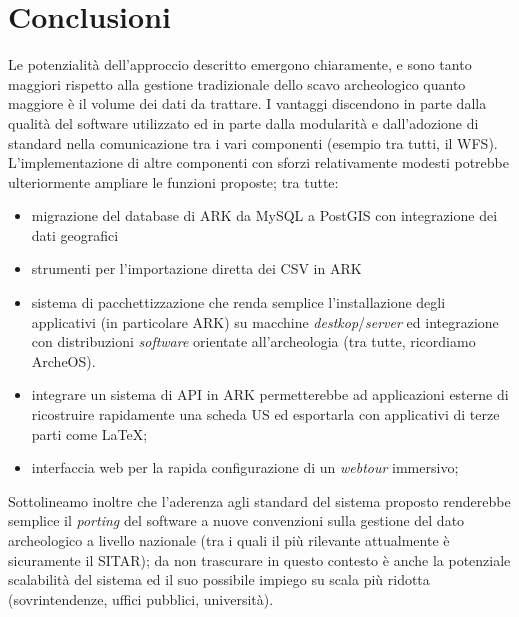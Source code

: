 \documentclass{paper}
\begin{document}
\section{Conclusioni}

    Le potenzialità dell'approccio descritto emergono chiaramente, e sono tanto maggiori rispetto alla gestione tradizionale dello scavo archeologico quanto maggiore è il volume dei dati da trattare. I vantaggi discendono in parte dalla qualità del software utilizzato ed in parte dalla modularità e dall'adozione di standard nella comunicazione tra i vari componenti (esempio tra tutti, il WFS). L'implementazione di altre componenti con sforzi relativamente modesti potrebbe ulteriormente ampliare le funzioni proposte; tra tutte:

    \begin{itemize}
        \item migrazione del database di ARK da MySQL a PostGIS con integrazione dei dati geografici
        \item strumenti per l'importazione diretta dei CSV in ARK
        \item sistema di pacchettizzazione che renda semplice l'installazione degli applicativi (in particolare ARK) su macchine \textit{destkop}/\textit{server} ed integrazione con distribuzioni \textit{software} orientate all'archeologia (tra tutte, ricordiamo ArcheOS).
        \item integrare un sistema di API in ARK permetterebbe ad applicazioni esterne di ricostruire rapidamente una scheda US ed esportarla con applicativi di terze parti come \LaTeX{};
        \item interfaccia web per la rapida configurazione di un \textit{webtour} immersivo;
    \end{itemize}

    Sottolineamo inoltre che l'aderenza agli standard del sistema proposto renderebbe semplice il \emph{porting} del software a nuove convenzioni sulla gestione del dato archeologico a livello nazionale (tra i quali il più rilevante attualmente è sicuramente il SITAR); da non trascurare in questo contesto è anche la potenziale scalabilità del sistema ed il suo possibile impiego su scala più ridotta (sovrintendenze, uffici pubblici, università).
\end{document}
